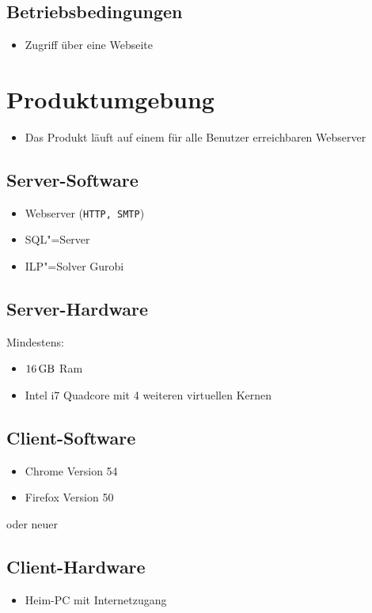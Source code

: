 \documentclass[parskip=full]{scrartcl}
\begin{document}
\subsection{Betriebsbedingungen}
\begin{itemize} 
  \item Zugriff über eine Webseite
\end{itemize}
\section{Produktumgebung}

\begin{itemize} 
  \item Das Produkt läuft auf einem für alle Benutzer erreichbaren Webserver
\end{itemize}
\subsection{Server-Software}
\begin{itemize} 
  \item Webserver (\texttt{HTTP, SMTP})
  \item SQL"=Server
  \item ILP"=Solver Gurobi %
\end{itemize}
\subsection{Server-Hardware}
Mindestens:
\begin{itemize} 
  \item $\SI{16}{\giga\byte}$ Ram
  \item Intel i7 Quadcore mit 4 weiteren virtuellen Kernen 
\end{itemize}

\subsection{Client-Software}
\begin{itemize}
  \item Chrome Version 54
  \item Firefox Version 50
\end{itemize}
oder neuer
\subsection{Client-Hardware}
\begin{itemize}
  \item Heim-PC mit Internetzugang %
\end{itemize}
\end{document}
